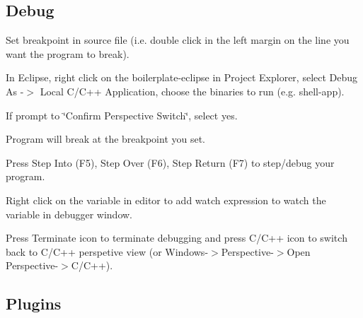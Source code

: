 \subsection*{Debug}


\begin{DoxyEnumerate}
\item Set breakpoint in source file (i.\+e. double click in the left margin on the line you want the program to break).
\item In Eclipse, right click on the boilerplate-\/eclipse in Project Explorer, select Debug As -\/$>$ Local C/\+C++ Application, choose the binaries to run (e.\+g. shell-\/app).
\item If prompt to \char`\"{}\+Confirm Perspective Switch\char`\"{}, select yes.
\item Program will break at the breakpoint you set.
\item Press Step Into (F5), Step Over (F6), Step Return (F7) to step/debug your program.
\item Right click on the variable in editor to add watch expression to watch the variable in debugger window.
\item Press Terminate icon to terminate debugging and press C/\+C++ icon to switch back to C/\+C++ perspetive view (or Windows-\/$>$Perspective-\/$>$Open Perspective-\/$>$C/\+C++).
\end{DoxyEnumerate}

\subsection*{Plugins}


